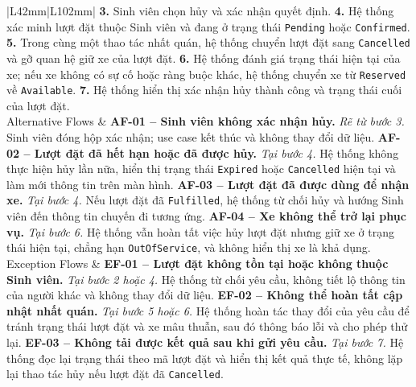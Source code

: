 \begin{longtable}{|L{42mm}|L{102mm}|}
    \textbf{3.} Sinh viên chọn hủy và xác nhận quyết định.\newline
    \textbf{4.} Hệ thống xác minh lượt đặt thuộc Sinh viên và đang ở trạng thái \texttt{Pending} hoặc \texttt{Confirmed}.\newline
    \textbf{5.} Trong cùng một thao tác nhất quán, hệ thống chuyển lượt đặt sang \texttt{Cancelled} và gỡ quan hệ giữ xe của lượt đặt.\newline
    \textbf{6.} Hệ thống đánh giá trạng thái hiện tại của xe; nếu xe không có sự cố hoặc ràng buộc khác, hệ thống chuyển xe từ \texttt{Reserved} về \texttt{Available}.\newline
    \textbf{7.} Hệ thống hiển thị xác nhận hủy thành công và trạng thái cuối của lượt đặt.\\\hline
  Alternative Flows &
    \textbf{AF-01 -- Sinh viên không xác nhận hủy.} \textit{Rẽ từ bước 3.} Sinh viên đóng hộp xác nhận; use case kết thúc và không thay đổi dữ liệu.\newline
    \textbf{AF-02 -- Lượt đặt đã hết hạn hoặc đã được hủy.} \textit{Tại bước 4.} Hệ thống không thực hiện hủy lần nữa, hiển thị trạng thái \texttt{Expired} hoặc \texttt{Cancelled} hiện tại và làm mới thông tin trên màn hình.\newline
    \textbf{AF-03 -- Lượt đặt đã được dùng để nhận xe.} \textit{Tại bước 4.} Nếu lượt đặt đã \texttt{Fulfilled}, hệ thống từ chối hủy và hướng Sinh viên đến thông tin chuyến đi tương ứng.\newline
    \textbf{AF-04 -- Xe không thể trở lại phục vụ.} \textit{Tại bước 6.} Hệ thống vẫn hoàn tất việc hủy lượt đặt nhưng giữ xe ở trạng thái hiện tại, chẳng hạn \texttt{OutOfService}, và không hiển thị xe là khả dụng.\\\hline
  Exception Flows &
    \textbf{EF-01 -- Lượt đặt không tồn tại hoặc không thuộc Sinh viên.} \textit{Tại bước 2 hoặc 4.} Hệ thống từ chối yêu cầu, không tiết lộ thông tin của người khác và không thay đổi dữ liệu.\newline
    \textbf{EF-02 -- Không thể hoàn tất cập nhật nhất quán.} \textit{Tại bước 5 hoặc 6.} Hệ thống hoàn tác thay đổi của yêu cầu để tránh trạng thái lượt đặt và xe mâu thuẫn, sau đó thông báo lỗi và cho phép thử lại.\newline
    \textbf{EF-03 -- Không tải được kết quả sau khi gửi yêu cầu.} \textit{Tại bước 7.} Hệ thống đọc lại trạng thái theo mã lượt đặt và hiển thị kết quả thực tế, không lặp lại thao tác hủy nếu lượt đặt đã \texttt{Cancelled}.\newline

\end{longtable}
